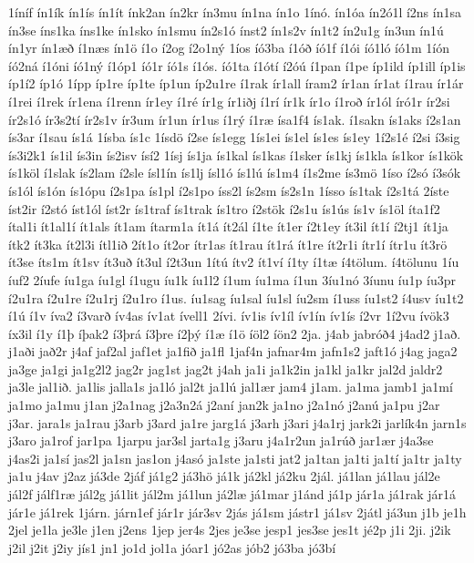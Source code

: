 {1íníf
ín1ík
ín1ís
ín1ít
ínk2an
ín2kr
ín3mu
ín1na
ín1o
1ínó.
ín1óa
ín2ó1l
í2ns
ín1sa
ín3se
íns1ka
íns1ke
ín1sko
ín1smu
ín2s1ó
ínst2
ín1s2v
ín1t2
ín2u1g
ín3un
ín1ú
ín1yr
ín1æð
í1næs
ín1ö
í1o
í2og
í2o1ný
1íos
íó3ba
í1óð
íó1f
í1ói
íó1ló
íó1m
1íón
íó2ná
í1óni
íó1ný
í1óp1
íó1r
íó1s
í1ós.
íó1ta
í1ótí
í2óú
í1pan
í1pe
íp1ild
íp1ill
íp1is
íp1í2
íp1ó
1ípp
íp1re
íp1te
íp1un
íp2u1re
í1rak
ír1all
íram2
ír1an
ír1at
í1rau
ír1ár
í1rei
í1rek
ír1ena
í1renn
ír1ey
í1ré
ír1g
ír1iðj
í1rí
ír1k
ír1o
í1roð
ír1ól
író1r
ír2si
ír2s1ó
ír3s2tí
ír2s1v
ír3um
ír1un
ír1us
í1rý
í1ræ
ísa1f4
ís1ak.
í1sakn
ís1aks
í2s1an
ís3ar
í1sau
ís1á
1ísba
ís1c
1ísdö
í2se
ís1egg
1ís1ei
ís1el
ís1es
ís1ey
1í2s1é
í2si
í3sig
ís3i2k1
ís1il
ís3in
ís2isv
ísí2
1ísj
ís1ja
ís1kal
ís1kas
í1sker
ís1kj
ís1kla
ís1kor
ís1kök
ís1köl
í1slak
ís2lam
í2sle
ísl1ín
ís1lj
ísl1ó
ís1lú
ís1m4
í1s2me
ís3mö
1íso
í2só
í3sók
ís1ól
ís1ón
ís1ópu
í2s1pa
ís1pl
í2s1po
íss2l
ís2sm
ís2s1n
1ísso
ís1tak
í2s1tá
2íste
íst2ir
í2stó
íst1ól
íst2r
ís1traf
ís1trak
ís1tro
í2stök
í2s1u
ís1ús
ís1v
ís1öl
íta1f2
ítal1i
ít1al1í
ít1als
ít1am
ítarm1a
ít1á
ít2ál
í1te
ít1er
í2t1ey
ít3il
ít1í
í2tj1
ít1ja
ítk2
ít3ka
ít2l3i
ítl1ið
2ít1o
ít2or
ítr1as
ít1rau
ít1rá
ít1re
ít2r1i
ítr1í
ítr1u
ít3rö
ít3se
íts1m
ít1sv
ít3uð
ít3ul
í2t3un
1ítú
ítv2
ít1ví
í1ty
í1tæ
í4tölum.
í4tölunu
1íu
íuf2
2íufe
íu1ga
íu1gl
í1ugu
íu1k
íu1l2
í1um
íu1ma
í1un
3íu1nó
3íunu
íu1p
íu3pr
í2u1ra
í2u1re
í2u1rj
í2u1ro
í1us.
íu1sag
íu1sal
íu1sl
íu2sm
í1uss
íu1st2
í4usv
íu1t2
í1ú
í1v
íva2
í3varð
ív4as
ív1at
ívell1
2ívi.
ív1is
ív1íl
ív1ín
ív1ís
í2vr
1í2vu
ívök3
íx3il
í1y
í1þ
íþak2
í3þrá
í3þre
í2þý
í1æ
í1ö
íöl2
íön2
2ja.
j4ab
jabróð4
j4ad2
j1að.
j1aði
jað2r
j4af
jaf2al
jaf1et
ja1fið
ja1fl
1jaf4n
jafnar4m
jafn1s2
jaft1ó
j4ag
jaga2
ja3ge
ja1gi
ja1g2l2
jag2r
jag1st
jag2t
j4ah
ja1i
ja1k2in
ja1kl
ja1kr
jal2d
jaldr2
ja3le
jal1ið.
ja1lis
jalla1s
ja1ló
jal2t
ja1lú
jal1ær
jam4
j1am.
ja1ma
jamb1
ja1mí
ja1mo
ja1mu
j1an
j2a1nag
j2a3n2á
j2aní
jan2k
ja1no
j2a1nó
j2anú
ja1pu
j2ar
j3ar.
jara1s
ja1rau
j3arb
j3ard
ja1re
jarg1á
j3arh
j3ari
j4a1rj
jark2i
jarlík4n
jarn1s
j3aro
ja1rof
jar1pa
1jarpu
jar3sl
jarta1g
j3aru
j4a1r2un
ja1rúð
jar1ær
j4a3se
j4as2i
ja1sí
jas2l
ja1sn
jas1on
j4asó
ja1ste
ja1sti
jat2
ja1tan
ja1ti
ja1tí
ja1tr
ja1ty
ja1u
j4av
j2az
já3de
2jáf
já1g2
já3hö
já1k
já2kl
já2ku
2jál.
já1lan
já1lau
jál2e
jál2f
jálf1ræ
jál2g
já1lit
jál2m
já1lun
já2læ
já1mar
j1ánd
já1p
jár1a
já1rak
jár1á
jár1e
já1rek
1járn.
járn1ef
jár1r
jár3sv
2jás
já1sm
jástr1
já1sv
2játl
já3un
j1b
je1h
2jel
je1la
je3le
j1en
j2ens
1jep
jer4s
2jes
je3se
jesp1
jes3se
jes1t
jé2p
j1i
2ji.
j2ik
j2il
j2it
j2iy
jís1
jn1
jo1d
jol1a
jóar1
jó2as
jób2
jó3ba
jó3bí
}
